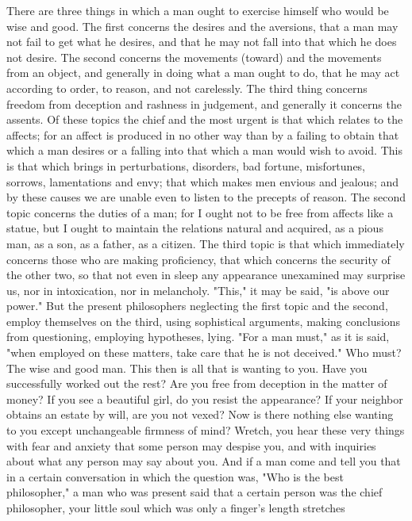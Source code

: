 \documentclass[a4paper]{article}
\begin{document}
    There are three things in which a man ought to exercise himself who would
be wise and good. The first concerns the desires and the aversions, that a man
may not fail to get what he desires, and that he may not fall into that which
he does not desire. The second concerns the movements (toward) and the
movements from an object, and generally in doing what a man ought to do, that
he may act according to order, to reason, and not carelessly. The third thing
concerns freedom from deception and rashness in judgement, and generally it
concerns the assents. Of these topics the chief and the most urgent is that
which relates to the affects; for an affect is produced in no other way than by
a failing to obtain that which a man desires or a falling into that which a man
would wish to avoid. This is that which brings in perturbations, disorders, bad
fortune, misfortunes, sorrows, lamentations and envy; that which makes men
envious and jealous; and by these causes we are unable even to listen to the
precepts of reason. The second topic concerns the duties of a man; for I ought
not to be free from affects like a statue, but I ought to maintain the
relations natural and acquired, as a pious man, as a son, as a father, as a
citizen.
    The third topic is that which immediately concerns those who are making
proficiency, that which concerns the security of the other two, so that not
even in sleep any appearance unexamined may surprise us, nor in intoxication,
nor in melancholy. "This," it may be said, "is above our power." But the
present philosophers neglecting the first topic and the second, employ
themselves on the third, using sophistical arguments, making conclusions from
questioning, employing hypotheses, lying. "For a man must," as it is said,
"when employed on these matters, take care that he is not deceived." Who must?
The wise and good man. This then is all that is wanting to you. Have you
successfully worked out the rest? Are you free from deception in the matter of
money? If you see a beautiful girl, do you resist the appearance? If your
neighbor obtains an estate by will, are you not vexed? Now is there nothing
else wanting to you except unchangeable firmness of mind? Wretch, you hear
these very things with fear and anxiety that some person may despise you, and
with inquiries about what any person may say about you. And if a man come and
tell you that in a certain conversation in which the question was, "Who is the
best philosopher," a man who was present said that a certain person was the
chief philosopher, your little soul which was only a finger's length stretches
\end{document}
